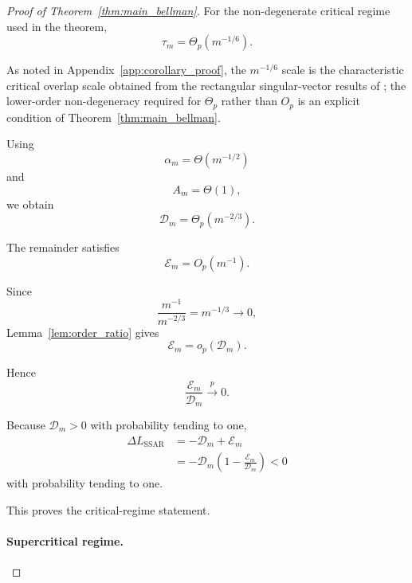 \begin{proof}[Proof of Theorem~\ref{thm:main_bellman}]
For the non-degenerate critical regime used in the theorem,
\begin{equation}
\tau_m
=
\Theta_p(m^{-1/6}).
\end{equation}

As noted in Appendix~\ref{app:corollary_proof}, the $m^{-1/6}$ scale is the
characteristic critical overlap scale obtained from the rectangular
singular-vector results of \cite{ding2020high}; the lower-order
non-degeneracy required for $\Theta_p$ rather than $O_p$ is an explicit
condition of Theorem~\ref{thm:main_bellman}.

Using
\begin{equation}
\alpha_m=\Theta(m^{-1/2})
\end{equation}
and
\begin{equation}
A_m=\Theta(1),
\end{equation}
we obtain
\begin{equation}
\mathcal D_m
=
\Theta_p(m^{-2/3}).
\end{equation}

The remainder satisfies
\begin{equation}
\mathcal E_m
=
O_p(m^{-1}).
\end{equation}

Since
\begin{equation}
\frac{m^{-1}}{m^{-2/3}}
=
m^{-1/3}
\rightarrow0,
\end{equation}
Lemma~\ref{lem:order_ratio} gives
\begin{equation}
\mathcal E_m
=
o_p(\mathcal D_m).
\end{equation}

Hence
\begin{equation}
\frac{\mathcal E_m}{\mathcal D_m}
\xrightarrow{p}
0.
\end{equation}

Because $\mathcal D_m>0$ with probability tending to one,
\begin{align}
\Delta L_{\mathrm{SSAR}}
&=
-\mathcal D_m+\mathcal E_m
\\
&=
-\mathcal D_m
\left(
1-\frac{\mathcal E_m}{\mathcal D_m}
\right)
<
0
\end{align}
with probability tending to one.

This proves the critical-regime statement.


\paragraph{Supercritical regime.}


\end{proof}

